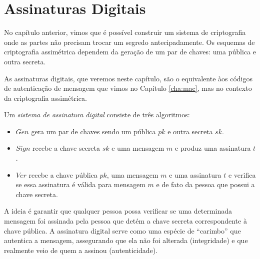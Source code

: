 \chapter{Assinaturas Digitais}
\label{cha:assinaturas-digitais}

No capítulo anterior, vimos que é possível construir um sistema de criptografia onde as partes não precisam trocar um segredo antecipadamente.
Os esquemas de criptografia assimétrica dependem da geração de um par de chaves: uma pública e outra secreta.

As assinaturas digitais, que veremos neste capítulo, são o equivalente àos códigos de autenticação de mensagem que vimos no Capítulo \ref{cha:mac}, mas no contexto da criptografia assimétrica.

\begin{center}
\end{center}

Um {\em sistema de assinatura digital} consiste de três algoritmos:
\begin{itemize}
\item $Gen$ gera um par de chaves sendo um pública $pk$ e outra secreta $sk$.
\item $Sign$ recebe a chave secreta $sk$ e uma mensagem $m$ e produz uma assinatura $t$.
\item $Ver$ recebe a chave pública $pk$, uma mensagem $m$ e uma assinatura $t$ e verifica se essa assinatura é válida para mensagem $m$ e de fato da pessoa que possui a chave secreta.
\end{itemize}

A ideia é garantir que qualquer pessoa possa verificar se uma determinada mensagem foi assinada pela pessoa que detém a chave secreta correspondente à chave pública.
A assinatura digital serve como uma espécie de ``carimbo'' que autentica a mensagem, assegurando que ela não foi alterada (integridade) e que realmente veio de quem a assinou (autenticidade).

